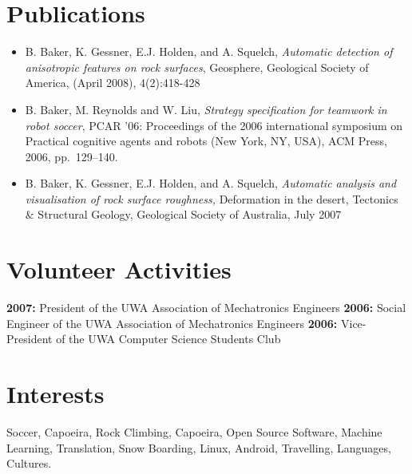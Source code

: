 \documentclass[10pt, a4paper]{report}
\begin{document}
\vfill

\section*{Publications}
\begin{itemize}
\item B. Baker, K. Gessner, E.J. Holden, and A. Squelch,  \emph{Automatic detection of anisotropic features on
rock surfaces}, Geosphere, Geological Society of America, (April 2008), 4(2):418-428
\item B. Baker, M. Reynolds and W. Liu, \emph{Strategy specification for
  teamwork in robot soccer}, PCAR '06: Proceedings of the 2006 international
  symposium on Practical cognitive agents and robots (New York, NY, USA), ACM
  Press, 2006, pp.~129--140.
\item B. Baker, K. Gessner, E.J. Holden, and A. Squelch, \emph{Automatic analysis and 
visualisation of rock surface roughness,} Deformation in the desert, Tectonics \& Structural Geology, Geological Society of Australia, July 
2007
\end{itemize}

%


\vfill

\section*{Volunteer Activities}
{\bf 2007:} President of the UWA Association of Mechatronics Engineers \newline
{\bf 2006:} Social Engineer of the UWA Association of Mechatronics Engineers \newline
{\bf 2006:} Vice-President of the UWA Computer Science Students Club \newline


\vfill

\section*{Interests}
{ Soccer, Capoeira, Rock Climbing, Capoeira, Open Source Software, Machine Learning, Translation, Snow Boarding, Linux, Android, Travelling, Languages, Cultures.}
\end{document}
